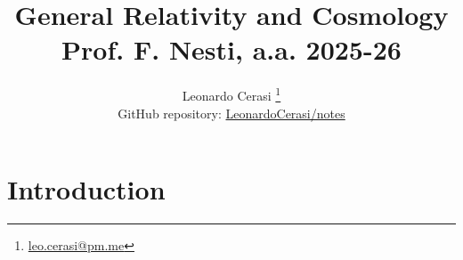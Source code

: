 \documentclass[a4paper, 12pt]{book}
\title{\Huge\textbf{General Relativity and Cosmology} \\ \large Prof. F. Nesti, a.a. 2025-26}
\author{Leonardo Cerasi%
	\thanks{\scriptsize\href{mailto:leo.cerasi@pm.me}{leo.cerasi@pm.me}} \\
	\small GitHub repository: \href{https://github.com/LeonardoCerasi/notes}{LeonardoCerasi/notes}}
\date{}
\begin{document}
\frontmatter

\maketitle

\toc

\pagestyle{contents}

\mainmatter

\pagestyle{introd}
\chapter{Introduction}

\end{document}
